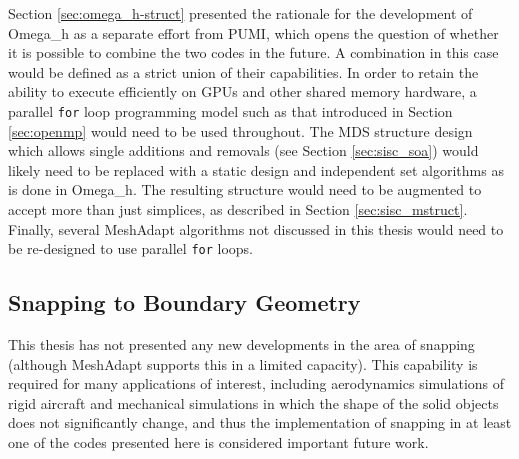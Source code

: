 Section \ref{sec:omega_h-struct} presented the rationale
for the development of Omega\_h as a separate effort from PUMI,
which opens the question of whether it is possible
to combine the two codes in the future.
A combination in this case would be defined as a strict
union of their capabilities.
In order to retain the ability to execute efficiently
on GPUs and other shared memory hardware, a parallel
\texttt{for} loop programming model such as that introduced
in Section \ref{sec:openmp} would need to be used throughout.
The MDS structure design which allows single additions
and removals (see Section \ref{sec:sisc_soa}) would likely
need to be replaced with a static design and independent
set algorithms as is done in Omega\_h.
The resulting structure would need to be augmented to
accept more than just simplices, as described in Section \ref{sec:sisc_mstruct}.
Finally, several MeshAdapt algorithms not discussed
in this thesis would need to be re-designed to use parallel
\texttt{for} loops.

\subsection{Snapping to Boundary Geometry}

This thesis has not presented any new developments in the area of
snapping (although MeshAdapt supports this in a limited capacity).
This capability is required for many applications of interest,
including aerodynamics simulations of rigid aircraft and mechanical
simulations in which the shape of the solid objects does not
significantly change,
and thus the implementation of snapping in at least one of the
codes presented here is considered important future work.
